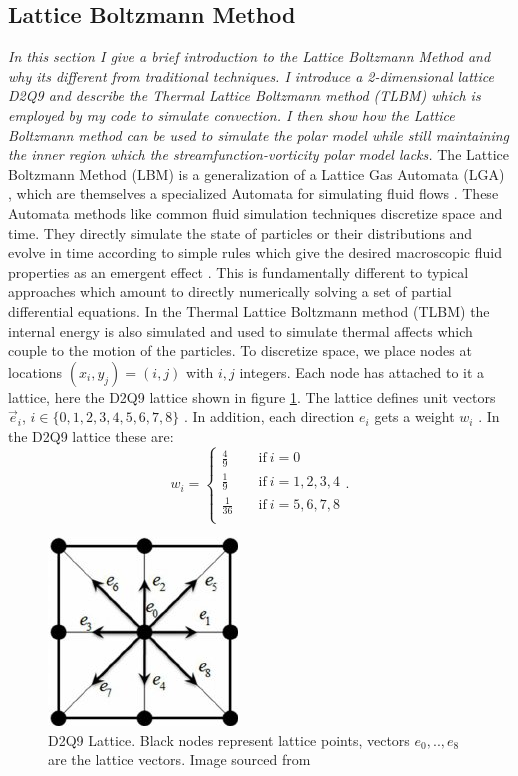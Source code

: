 \documentclass{article}
\begin{document}
\subsection*{Lattice Boltzmann Method}
{\it{In this section I give a brief introduction to the Lattice Boltzmann Method and why its different from traditional techniques. I introduce a 2-dimensional lattice D2Q9 and describe the Thermal Lattice Boltzmann method (TLBM) which is employed by my code to simulate convection. I then show how the Lattice Boltzmann method can be used to simulate the polar model while still maintaining the inner region which the streamfunction-vorticity polar model lacks.}}
\vspace{0.3cm}
\newline
\noindent The Lattice Boltzmann Method (LBM) is a generalization of a Lattice Gas Automata (LGA) , which are themselves a 
specialized Automata for simulating fluid flows \cite{rothman2004lattice}. These Automata methods like common fluid simulation techniques 
discretize space and time. They directly simulate the state of particles or their distributions and evolve in time 
according to simple rules which give the desired macroscopic fluid properties as an emergent effect \cite{wagner2008practical}. This is fundamentally 
different to typical approaches which amount to directly numerically solving a set of partial differential equations. In the Thermal Lattice Boltzmann method (TLBM) the internal energy is also simulated and used to simulate thermal affects which couple to the motion of the particles.
\newline
\noindent To discretize space, we place nodes at locations $(x_i,y_j)=(i,j)$ with $i,j$ integers. Each node has attached to it a lattice, here the D2Q9 lattice shown in figure \ref{D2Q9}. The lattice defines unit vectors $\vec{e}_i$, $i \in \{ 0,1,2,3,4,5,6,7,8 \}$ \cite{mora2017simulation}. In addition, each direction $e_i$ gets a weight $w_i$ \cite{mora2017simulation}. In the D2Q9 lattice these are:
\begin{equation*}
w_i = \begin{cases}
          \frac{4}{9} \quad &\text{if}  \ i=0 \\
          \frac{1}{9} \quad &\text{if} \ i=1,2,3,4 \\
          \frac{1}{36} \quad &\text{if} \ i=5,6,7,8 \\
     \end{cases}.
\end{equation*}
\begin{figure}[H]
	\centering
	\includegraphics{D2Q9Lattice.jpg}
	\caption{D2Q9 Lattice. Black nodes represent lattice points, vectors $e_0,..,e_8$ are the lattice vectors. Image sourced from \cite{khazaeli2015ghost}}
	\label{D2Q9}
\end{figure}
\end{document}
